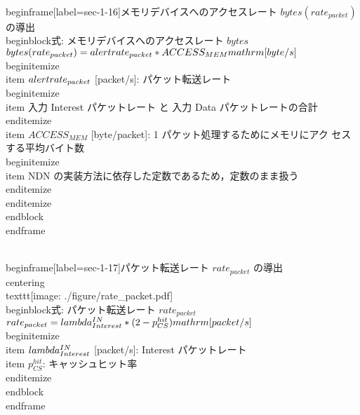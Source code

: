 {{{\\begin{frame}[label=sec-1-16]{メモリデバイスへのアクセスレート $bytes (rate_{packet})$ の導出}
\\begin{block}{式: メモリデバイスへのアクセスレート $bytes$}%
$bytes (rate_{packet}) = \\alert{rate_{packet}} * ACCESS_{MEM} \\mathrm{[byte/s]}$
\\begin{itemize}
\\item $\\alert{rate_{packet}}$ [packet/s]: パケット転送レート
\\begin{itemize}
\\item 入力 Interest パケットレート と 入力 Data パケットレートの合計
\\end{itemize}
\\item $ACCESS_{MEM}$ [byte/packet]: 1 パケット処理するためにメモリにアク
セスする平均バイト数
\\begin{itemize}
\\item NDN の実装方法に依存した定数であるため，定数のまま扱う
\\end{itemize}
\\end{itemize}
\\end{block}
\\end{frame}

\\begin{frame}[label=sec-1-17]{パケット転送レート $rate_{packet}$ の導出}
\\centering
\\texttt{[image: ./figure/rate\_packet.pdf]}
\\begin{block}{式: パケット転送レート $rate_{packet}$}%
$rate_{packet} = \\lambda^{IN}_{Interest} * (2 - p^{hit}_{CS}) \\mathrm{[packet/s]}$
\\begin{itemize}
\\item $\\lambda^{IN}_{Interest}$ [packet/s]: Interest パケットレート
\\item $p^{hit}_{CS}$: キャッシュヒット率
\\end{itemize}
\\end{block}
\\end{frame}

}}}
